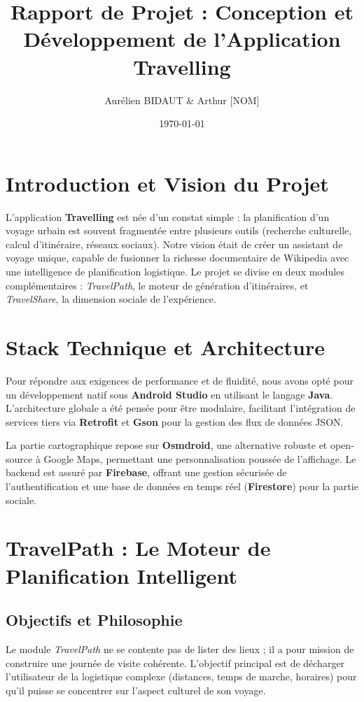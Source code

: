\documentclass[12pt,a4paper]{article}
\title{Rapport de Projet : Conception et Développement de l'Application Travelling}
\author{Aurélien BIDAUT \& Arthur [NOM]}
\date{\today}
\begin{document}
\maketitle
\newpage
\tableofcontents
\newpage

\section{Introduction et Vision du Projet}
L'application \textbf{Travelling} est née d'un constat simple : la planification d'un voyage urbain est souvent fragmentée entre plusieurs outils (recherche culturelle, calcul d'itinéraire, réseaux sociaux). Notre vision était de créer un assistant de voyage unique, capable de fusionner la richesse documentaire de Wikipedia avec une intelligence de planification logistique. Le projet se divise en deux modules complémentaires : \textit{TravelPath}, le moteur de génération d'itinéraires, et \textit{TravelShare}, la dimension sociale de l'expérience.

\section{Stack Technique et Architecture}
Pour répondre aux exigences de performance et de fluidité, nous avons opté pour un développement natif sous \textbf{Android Studio} en utilisant le langage \textbf{Java}. L'architecture globale a été pensée pour être modulaire, facilitant l'intégration de services tiers via \textbf{Retrofit} et \textbf{Gson} pour la gestion des flux de données JSON.

La partie cartographique repose sur \textbf{Osmdroid}, une alternative robuste et open-source à Google Maps, permettant une personnalisation poussée de l'affichage. Le backend est assuré par \textbf{Firebase}, offrant une gestion sécurisée de l'authentification et une base de données en temps réel (\textbf{Firestore}) pour la partie sociale.

\section{TravelPath : Le Moteur de Planification Intelligent}
\subsection{Objectifs et Philosophie}
Le module \textit{TravelPath} ne se contente pas de lister des lieux ; il a pour mission de construire une journée de visite cohérente. L'objectif principal est de décharger l'utilisateur de la logistique complexe (distances, temps de marche, horaires) pour qu'il puisse se concentrer sur l'aspect culturel de son voyage.
\end{document}

